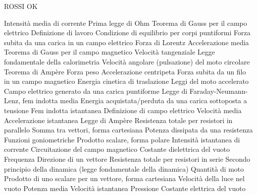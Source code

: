 \documentclass[a4paper,11pt,italian]{article}
\begin{document}
ROSSI OK
\begin{enumerate}
{Intensità media di corrente}
{Prima legge di Ohm}
{Teorema di Gauss per il campo elettrico}
{Definizione di lavoro}
{Condizione di equilibrio per corpi puntiformi}
{Forza subita da una carica in un campo elettrico}
{Forza di Lorentz}
{Accelerazione media}
{Teorema di Gauss per il campo magnetico}
{Velocità tangenziale}
{Legge fondamentale della calorimetria}
{Velocità angolare (pulsazione) del moto circolare}
{Teorema di Ampère}
{Forza peso}
{Accelerazione centripeta}
{Forza subita da un filo in un campo magnetico}
{Energia cinetica di traslazione}
{Leggi del moto accelerato}
{Campo elettrico generato da una carica puntiforme}
{Legge di Faraday-Neumann-Lenz, fem indotta media}
{Energia acquistata/perduta da una carica sottoposta a tensione}
{Fem indotta istantanea}
{Definizione di campo elettrico}
{Velocità media}
{Accelerazione istantanea}
{Legge di Ampère}
{Resistenza totale per resistori in parallelo}
{Somma tra vettori, forma cartesiana}
{Potenza dissipata da una resistenza}
{Funzioni goniometriche}
{Prodotto scalare, forma polare}
{Intensità istantanea di corrente}
{Circuitazione del campo magnetico}
{Costante dielettrica del vuoto}
{Frequenza }
{Direzione di un vettore }
{Resistenza totale per resistori in serie}
{Secondo principio della dinamica (legge fondamentale della dinamica)}
{Quantità di moto}
{Prodotto di uno scalare per un vettore, forma cartesiana}
{Velocità della luce nel vuoto}
{Potenza media}
{Velocità istantanea}
{Pressione}
{Costante elettrica del vuoto}
\end{enumerate}
\end{document}
